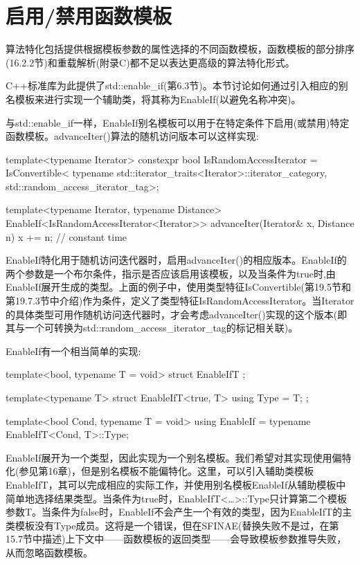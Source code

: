 \section{启用/禁用函数模板}

算法特化包括提供根据模板参数的属性选择的不同函数模板，函数模板的部分排序(16.2.2节)和重载解析(附录C)都不足以表达更高级的算法特化形式。

C++标准库为此提供了std::enable\_if(第6.3节)。本节讨论如何通过引入相应的别名模板来进行实现一个辅助类，将其称为EnableIf(以避免名称冲突)。

与std::enable\_if一样，EnableIf别名模板可以用于在特定条件下启用(或禁用)特定函数模板。advanceIter()算法的随机访问版本可以这样实现:

\begin{cpp}
template<typename Iterator>
constexpr bool IsRandomAccessIterator =
	IsConvertible<
		typename std::iterator_traits<Iterator>::iterator_category,
		std::random_access_iterator_tag>;
		
template<typename Iterator, typename Distance>
EnableIf<IsRandomAccessIterator<Iterator>>
advanceIter(Iterator& x, Distance n) {
	x += n; // constant time
}
\end{cpp}

EnableIf特化用于随机访问迭代器时，启用advanceIter()的相应版本。EnableIf的两个参数是一个布尔条件，指示是否应该启用该模板，以及当条件为true时,由EnableIf展开生成的类型。上面的例子中，使用类型特征IsConvertible(第19.5节和第19.7.3节中介绍)作为条件，定义了类型特征IsRandomAccessIterator。当Iterator的具体类型可用作随机访问迭代器时，才会考虑advanceIter()实现的这个版本(即其与一个可转换为std::random\_access\_iterator\_tag的标记相关联)。

EnableIf有一个相当简单的实现:

\begin{cpp}
template<bool, typename T = void>
struct EnableIfT {
};

template<typename T>
struct EnableIfT<true, T> {
	using Type = T;
};

template<bool Cond, typename T = void>
using EnableIf = typename EnableIfT<Cond, T>::Type;
\end{cpp}

EnableIf展开为一个类型，因此实现为一个别名模板。我们希望对其实现使用偏特化(参见第16章)，但是别名模板不能偏特化。这里，可以引入辅助类模板EnableIfT，其可以完成相应的实际工作，并使用别名模板EnableIf从辅助模板中简单地选择结果类型。当条件为true时，EnableIfT<…>::Type只计算第二个模板参数T。当条件为false时，EnableIf不会产生一个有效的类型，因为EnableIfT的主类模板没有Type成员。这将是一个错误，但在SFINAE(替换失败不是过，在第15.7节中描述)上下文中——函数模板的返回类型——会导致模板参数推导失败，从而忽略函数模板。

